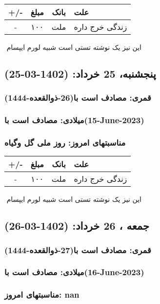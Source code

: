 \documentclass{article}
\newcommand{\rnote}[1]{\marginpar{\textcolor{color}{\StrSubstitute{\##1}{ }{\_}}}}
\newcommand{\myRow}[4]{
    #1 & #2 & #3 & #4 \\ \hline
}
\begin{document}
\begin{tabular}{ | c | c | c | p{5cm} |}
    \hline
    \myRow{ +/- }{مبلغ}{بانک}{علت}
    \myRow{-}{۱۰۰}{ملت}{زندگی خرج داره}
\end{tabular}
\newline
\newline

‌
\rnote{تست}
این نیز یک نوشته تستی است شبیه لورم ایپسام




\newpage
{}
\textcolor{color}{
\section{ پنجشنبه، 25 خرداد: (1402-03-25) }
\subsubsection*{قمری: مصادف است با(26-ذوالقعده-1444)} 
\subsubsection*{میلادی: مصادف است با(15-June-2023)}
\subsubsection*{مناسبتهای امروز: روز ملی گل وگیاه}
}


\begin{tabular}{ | c | c | c | p{5cm} |}
    \hline
    \myRow{ +/- }{مبلغ}{بانک}{علت}
    \myRow{-}{۱۰۰}{ملت}{زندگی خرج داره}
\end{tabular}
\newline
\newline

‌
\rnote{تست}
این نیز یک نوشته تستی است شبیه لورم ایپسام




\newpage
{}
\textcolor{color}{
\section{ جمعه ، 26 خرداد: (1402-03-26) }
\subsubsection*{قمری: مصادف است با(27-ذوالقعده-1444)} 
\subsubsection*{میلادی: مصادف است با(16-June-2023)}
\subsubsection*{مناسبتهای امروز: nan}
}
\end{document}
